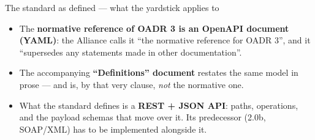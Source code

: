 \begin{frame}{The standard as defined — what the yardstick applies to}

  \footnotesize
  \setlength{\itemsep}{4pt}
  \setlength{\parsep}{0pt}

  \begin{itemize}
    \item The \textbf{normative reference of OADR 3 is an OpenAPI document (YAML)}:
      the Alliance calls it ``the normative reference for OADR 3'', and it
      ``supersedes any statements made in other documentation''.
    \item The accompanying \textbf{``Definitions'' document} restates the same
      model in prose — and is, by that very clause, \emph{not} the normative one.
    \item What the standard defines is a \textbf{REST + JSON API}: paths,
      operations, and the payload schemas that move over it. Its predecessor
      (2.0b, SOAP/XML) has to be implemented alongside it.
  \end{itemize}

\end{frame}
